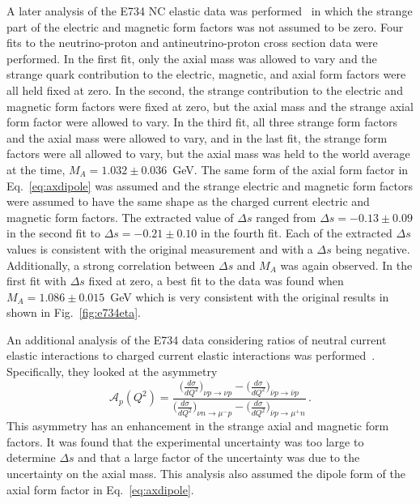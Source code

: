   A later analysis of the E734 NC elastic data was
  performed~\cite{Garvey:1992cg} in which the strange part of the electric
  and magnetic form factors was not assumed to be zero. Four fits to the
  neutrino-proton and antineutrino-proton cross section data were performed.
  In the first fit, only the axial mass was allowed to vary and the strange
  quark contribution to the electric, magnetic, and axial form factors were
  all held fixed at zero. In the second, the strange contribution to the
  electric and magnetic form factors were fixed at zero, but the axial mass
  and the strange axial form factor were allowed to vary. In the third fit,
  all three strange form factors and the axial mass were allowed to vary, and
  in the last fit, the strange form factors were all allowed to vary, but the
  axial mass was held to the world average at the time, $M_A =
  1.032\pm0.036$~GeV. The same form of the axial form factor in
  Eq.~\ref{eq:axdipole} was assumed and the strange electric and magnetic
  form factors were assumed to have the same shape as the charged current
  electric and magnetic form factors. The extracted value of $\Delta s$
  ranged from $\Delta s = -0.13 \pm 0.09$ in the second fit to $\Delta s =
  -0.21 \pm 0.10$ in the fourth fit.  Each of the extracted $\Delta s$ values
  is consistent with the original measurement and with a $\Delta s$ being
  negative.  Additionally, a strong correlation between $\Delta s$ and $M_A$
  was again observed. In the first fit with $\Delta s$ fixed at zero, a best
  fit to the data was found when $M_A = 1.086 \pm 0.015$~GeV which is very
  consistent with the original results in~\cite{Ahrens:1986xe} shown in
  Fig.~\ref{fig:e734eta}.

  An additional analysis of the E734 data considering ratios of neutral
  current elastic interactions to charged current elastic interactions was
  performed~\cite{Alberico:1998qw}. Specifically, they looked at the
  asymmetry
  \begin{equation*}
    \mathcal{A}_p(Q^2) = \frac{\Big(\frac{d\sigma}{dQ^2}\Big)_{\nu p \rightarrow \nu p} - \Big(\frac{d\sigma}{dQ^2}\Big)_{\bar{\nu} p \rightarrow \bar{\nu} p} }{\Big(\frac{d\sigma}{dQ^2}\Big)_{\nu n \rightarrow \mu^- p} - \Big(\frac{d\sigma}{dQ^2}\Big)_{\bar{\nu} p \rightarrow \mu^+ n}} \,.
  \end{equation*}
  This asymmetry has an enhancement in the strange axial and magnetic form
  factors. It was found that the experimental uncertainty was too large to
  determine $\Delta s$ and that a large factor of the uncertainty was due to
  the uncertainty on the axial mass. This analysis also assumed the dipole
  form of the axial form factor in Eq.~\ref{eq:axdipole}.


